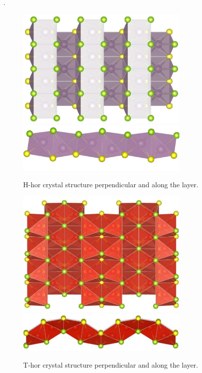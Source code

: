 .\documentclass[a4paperm]{article}
\begin{document}
\begin{figure}[H]
	\includegraphics[width=0.75\textwidth]{H_hor_1.jpg} \\
	\includegraphics[width=0.75\textwidth]{H_hor_2.jpg}
	\caption{H-hor crystal structure perpendicular and along the layer.}
\label{H_hor}
\end{figure} 


\begin{figure}[H]
        \includegraphics[width=0.75\textwidth]{T_hor_1.jpg} \\
        \includegraphics[width=0.75\textwidth]{T_hor_2.jpg}
        \caption{T-hor crystal structure perpendicular and along the layer.}
\label{T_hor}
\end{figure}
\end{document}
